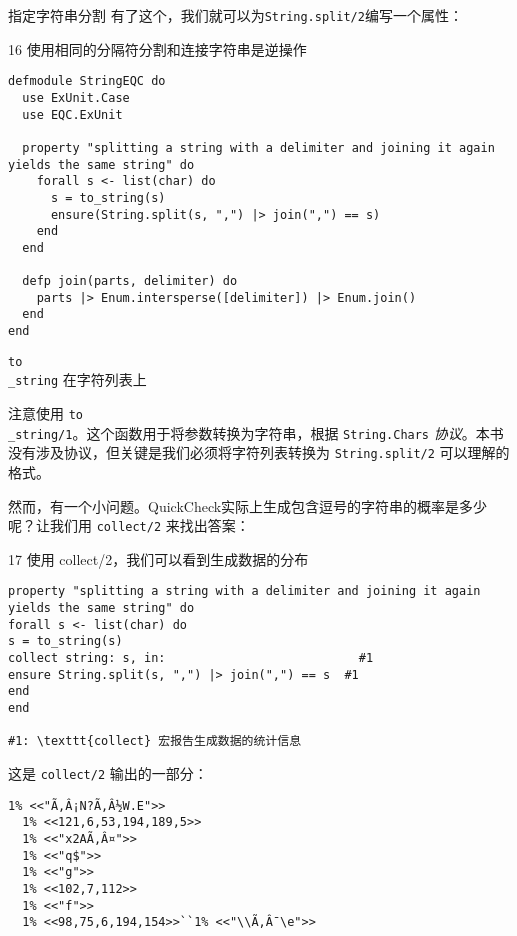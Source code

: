 \begin{example}{指定字符串分割}
有了这个，我们就可以为\texttt{String.split/2}编写一个属性：

\begin{code}{16 使用相同的分隔符分割和连接字符串是逆操作}

\begin{verbatim}
defmodule StringEQC do
  use ExUnit.Case
  use EQC.ExUnit

  property "splitting a string with a delimiter and joining it again yields the same string" do
    forall s <- list(char) do
      s = to_string(s)
      ensure(String.split(s, ",") |> join(",") == s)
    end
  end

  defp join(parts, delimiter) do
    parts |> Enum.intersperse([delimiter]) |> Enum.join()
  end
end
\end{verbatim}
\end{code}

\texttt{to\\\_string} 在字符列表上

注意使用
\texttt{to\\\_string/1}。这个函数用于将参数转换为字符串，根据
\texttt{String.Chars}
\emph{协议}。本书没有涉及协议，但关键是我们必须将字符列表转换为
\texttt{String.split/2} 可以理解的格式。

然而，有一个小问题。QuickCheck实际上生成包含逗号的字符串的概率是多少呢？让我们用
\texttt{collect/2} 来找出答案：

\begin{code}{17 使用 collect/2，我们可以看到生成数据的分布}

\begin{verbatim}
property "splitting a string with a delimiter and joining it again yields the same string" do
forall s <- list(char) do
s = to_string(s)
collect string: s, in:                           #1
ensure String.split(s, ",") |> join(",") == s  #1
end
end

#1: \texttt{collect} 宏报告生成数据的统计信息
\end{verbatim}
\end{code}


这是 \texttt{collect/2} 输出的一部分：
\begin{code}{}  \begin{verbatim}
1% <<"Ã‚Â¡N?Ã‚Â½W.E">>
  1% <<121,6,53,194,189,5>>
  1% <<"x2AÃ‚Â¤">>
  1% <<"q$">>
  1% <<"g">>
  1% <<102,7,112>>
  1% <<"f">>
  1% <<98,75,6,194,154>>``1% <<"\\Ã‚Â¯\e">>
\end{verbatim}
\end{code}
  


\end{example}
